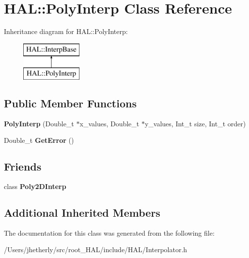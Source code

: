 \hypertarget{class_h_a_l_1_1_poly_interp}{\section{H\-A\-L\-:\-:Poly\-Interp Class Reference}
\label{class_h_a_l_1_1_poly_interp}
}
Inheritance diagram for H\-A\-L\-:\-:Poly\-Interp\-:\begin{figure}[H]
\begin{center}
\leavevmode
\includegraphics[height=2.000000cm]{class_h_a_l_1_1_poly_interp}
\end{center}
\end{figure}
\subsection*{Public Member Functions}
\begin{DoxyCompactItemize}
\item 
\hypertarget{class_h_a_l_1_1_poly_interp_af44f92e27052c066755a5beae2dc7b1b}{{\bfseries Poly\-Interp} (Double\-\_\-t $\ast$x\-\_\-values, Double\-\_\-t $\ast$y\-\_\-values, Int\-\_\-t size, Int\-\_\-t order)}\label{class_h_a_l_1_1_poly_interp_af44f92e27052c066755a5beae2dc7b1b}

\item 
\hypertarget{class_h_a_l_1_1_poly_interp_a1d87892f07ecdacaf6467a63371f044e}{Double\-\_\-t {\bfseries Get\-Error} ()}\label{class_h_a_l_1_1_poly_interp_a1d87892f07ecdacaf6467a63371f044e}

\end{DoxyCompactItemize}
\subsection*{Friends}
\begin{DoxyCompactItemize}
\item 
\hypertarget{class_h_a_l_1_1_poly_interp_a1d517ab352221a0d0a7fbfc8698724d7}{class {\bfseries Poly2\-D\-Interp}}\label{class_h_a_l_1_1_poly_interp_a1d517ab352221a0d0a7fbfc8698724d7}

\end{DoxyCompactItemize}
\subsection*{Additional Inherited Members}


The documentation for this class was generated from the following file\-:\begin{DoxyCompactItemize}
\item 
/\-Users/jhetherly/src/root\-\_\-\-H\-A\-L/include/\-H\-A\-L/Interpolator.\-h\end{DoxyCompactItemize}
